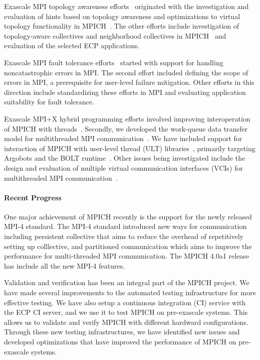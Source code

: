 Exascale MPI topology awareness efforts~\cite{Topo1,Topo2} originated
with the investigation and evaluation of hints based on topology
awareness and optimizations to virtual topology functionality in
MPICH~\cite{topo-io,topo-io2}. The other efforts include investigation
of topology-aware collectives and neighborhood collectives in
MPICH~\cite{coll} and evaluation of the selected ECP applications.

Exascale MPI fault tolerance efforts~\cite{FT1, FT2} started with
support for handling noncatastrophic errors in MPI. The second effort
included defining the scope of errors in MPI, a prerequisite for
user-level failure mitigation. Other efforts in this direction
include standardizing these efforts in MPI and evaluating application
suitability for fault tolerance.

Exascale MPI+X hybrid programming efforts involved
improving interoperation of MPICH with threads~\cite{interthread}.
Secondly, we developed the work-queue data transfer model for
multithreaded MPI communication~\cite{workq}. We have included support
for interaction of MPICH with user-level thread (ULT)
libraries~\cite{ULT}, primarily targeting Argobots and the BOLT
runtime~\cite{BOLT}.  Other issues being investigated include the
design and evaluation of multiple virtual communication
interfaces (VCIs) for multithreaded MPI communication~\cite{VCI}.

\paragraph{Recent Progress}

One major achievement of MPICH recently is the support for the newly
released MPI-4 standard. The MPI-4 standard introduced new ways for
communication including persistent collective that aims to reduce the
overhead of repetitively setting up colllective, and partitioned
communication which aims to improve the performance for multi-threaded
MPI communication. The MPICH 4.0a1 release has include all the new MPI-4 
features.

Validation and verification has been an integral part of the MPICH project.
We have made several improvements to the automated testing
infrastructure for more effective testing. We have also setup a continuous
integration (CI) service with the ECP CI server, and we use it to test MPICH
on pre-exascale systems. This allows us to validate and verify MPICH
with different hardward configurations. Through these new testing
infrastructures, we have identified new issues and developed
optimizations that have improved the performance of MPICH on pre-exascale
systems.

